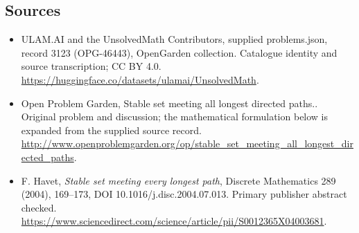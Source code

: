 \documentclass[11pt,a4paper]{article}
\begin{document}
\subsection{Sources}
\begin{itemize}
\item[S1] ULAM.AI and the UnsolvedMath Contributors, supplied problems.json, record 3123 (OPG-46443), OpenGarden collection. Catalogue identity and source transcription; CC BY 4.0.
\url{https://huggingface.co/datasets/ulamai/UnsolvedMath}.
\item[S2] Open Problem Garden, Stable set meeting all longest directed paths.. Original problem and discussion; the mathematical formulation below is expanded from the supplied source record.
\url{http://www.openproblemgarden.org/op/stable_set_meeting_all_longest_directed_paths}.
\item[R1] F. Havet, \emph{Stable set meeting every longest path}, Discrete Mathematics 289 (2004), 169--173, DOI 10.1016/j.disc.2004.07.013. Primary publisher abstract checked.
\url{https://www.sciencedirect.com/science/article/pii/S0012365X04003681}.
\end{itemize}
\end{document}
